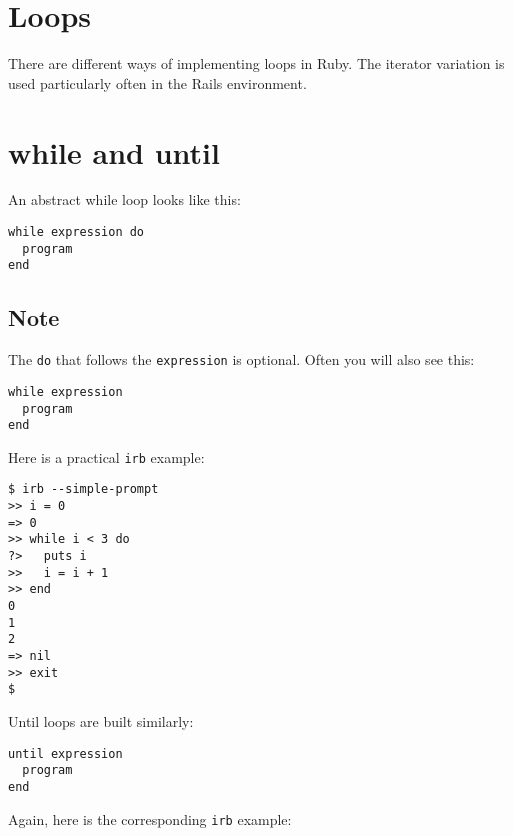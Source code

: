 \documentclass[a4paper]{book}
\begin{document}
\section{Loops}\label{loops}

There are different ways of implementing loops in Ruby. The iterator variation is used particularly often in the Rails environment.

\section{while and until}\label{while-and-until}

An abstract while loop looks like this:

\begin{shaded}\begin{verbatim}
while expression do
  program
end
\end{verbatim}\end{shaded}

\subsection{Note}\label{note-11}

The \texttt{do} that follows the \texttt{expression} is optional. Often you will also see this:

\begin{shaded}\begin{verbatim}
while expression
  program
end
\end{verbatim}\end{shaded}

Here is a practical \texttt{irb} example:

\begin{shaded}\begin{verbatim}
$ irb --simple-prompt
>> i = 0
=> 0
>> while i < 3 do
?>   puts i
>>   i = i + 1
>> end
0
1
2
=> nil
>> exit
$
\end{verbatim}\end{shaded}

Until loops are built similarly:

\begin{shaded}\begin{verbatim}
until expression
  program
end
\end{verbatim}\end{shaded}

Again, here is the corresponding \texttt{irb} example:
\end{document}
